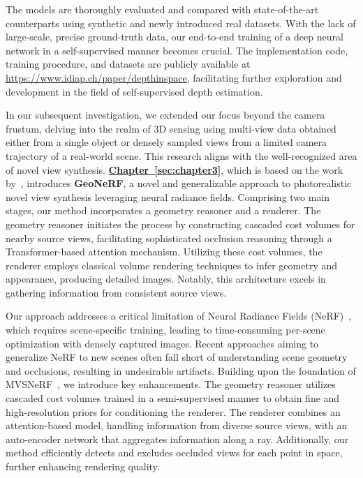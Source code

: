 The models are thoroughly evaluated and compared with state-of-the-art counterparts using synthetic and newly introduced real datasets. With the lack of large-scale, precise ground-truth data, our end-to-end training of a deep neural network in a self-supervised manner becomes crucial. The implementation code, training procedure, and datasets are publicly available at \href{https://www.idiap.ch/paper/depthinspace}{https://www.idiap.ch/paper/depthinspace}, facilitating further exploration and development in the field of self-supervised depth estimation.

In our subsequent investigation, we extended our focus beyond the camera frustum, delving into the realm of 3D sensing using multi-view data obtained either from a single object or densely sampled views from a limited camera trajectory of a real-world scene. This research aligns with the well-recognized area of novel view synthesis. \textbf{\hyperref[sec:chapter3]{Chapter~\ref{sec:chapter3}}}, which is based on the work by~\cite{johari2022geonerf}, introduces \textbf{GeoNeRF}, a novel and generalizable approach to photorealistic novel view synthesis leveraging neural radiance fields. Comprising two main stages, our method incorporates a geometry reasoner and a renderer. The geometry reasoner initiates the process by constructing cascaded cost volumes for nearby source views, facilitating sophisticated occlusion reasoning through a Transformer-based attention mechanism. Utilizing these cost volumes, the renderer employs classical volume rendering techniques to infer geometry and appearance, producing detailed images. Notably, this architecture excels in gathering information from consistent source views.

Our approach addresses a critical limitation of Neural Radiance Fields (NeRF)~\citep{mildenhall2020nerf}, which requires scene-specific training, leading to time-consuming per-scene optimization with densely captured images. Recent approaches aiming to generalize NeRF to new scenes often fall short of understanding scene geometry and occlusions, resulting in undesirable artifacts. Building upon the foundation of MVSNeRF~\citep{chen2021mvsnerf}, we introduce key enhancements. The geometry reasoner utilizes cascaded cost volumes trained in a semi-supervised manner to obtain fine and high-resolution priors for conditioning the renderer. The renderer combines an attention-based model, handling information from diverse source views, with an auto-encoder network that aggregates information along a ray. Additionally, our method efficiently detects and excludes occluded views for each point in space, further enhancing rendering quality.

